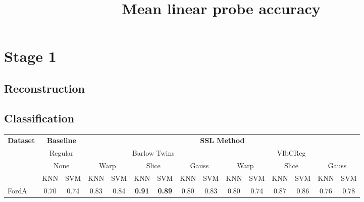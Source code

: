 \documentclass[../../thesis.tex]{subfiles}
\begin{document}
\section{Stage 1}

\subsection{Reconstruction}

\subsection{Classification}

\begin{table}[h!]
    \centering
    \title{Mean linear probe accuracy}
    \begin{adjustbox}{width=\textwidth}
    \begin{tabular}{lcc|cc|cc|cc|cc|cc|cc} %
        \toprule
        \multirow{4}{*}{\textbf{Dataset}} & \multicolumn{2}{c}{\textbf{Baseline}} & \multicolumn{12}{c}{\textbf{SSL Method}} \\
                                            \cmidrule(lr){2-3} \cmidrule(lr){4-15}
                                          & \multicolumn{2}{c}{Regular}           & \multicolumn{6}{c}{Barlow Twins}                                                 &  \multicolumn{6}{c}{VIbCReg} \\
                                          \cmidrule(lr){2-3} \cmidrule(lr){4-9} \cmidrule(lr){10-15}
                                          &   \multicolumn{2}{c}{None}            & \multicolumn{2}{c}{Warp}  & \multicolumn{2}{c}{Slice} & \multicolumn{2}{c}{Gauss} & \multicolumn{2}{c}{Warp} & \multicolumn{2}{c}{Slice} & \multicolumn{2}{c}{Gauss} \\
                                          \cmidrule(lr){2-3} \cmidrule(lr){4-5} \cmidrule(lr){6-7} \cmidrule(lr){8-9} \cmidrule(lr){10-11} \cmidrule(lr){12-13}\cmidrule(lr){14-15}
                                          & KNN & SVM                               & KNN & SVM                  & KNN & SVM                & KNN & SVM                 & KNN & SVM                 & KNN & SVM                 & KNN & SVM   \\
        \midrule
        FordA                   & 0.70 & 0.74 & 0.83 & 0.84 & \textbf{0.91} & \textbf{0.89} & 0.80 & 0.83 & 0.80 & 0.74 & 0.87 & 0.86 & 0.76 & 0.78 \\

\end{tabular}
\end{adjustbox}
\end{table}
\end{document}

